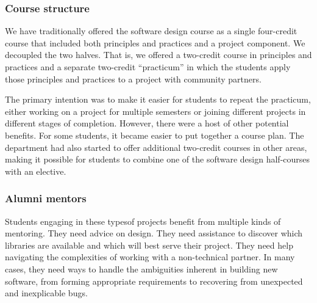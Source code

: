 \subsubsection{Course structure}

We have traditionally offered the software design course as a single
four-credit course that included both principles and practices
and a project component.  We decoupled the two halves.  That is,
we offered a two-credit course in principles and practices and a
separate two-credit ``practicum'' in which the students apply those
principles and practices to a project with community partners.

The primary intention was to make it easier for students to repeat
the practicum, either working on a project for multiple semesters
or joining different projects in different stages of completion.
However, there were a host of other potential benefits.  For some
students, it became easier to put together a course plan. 
The department had also started to offer additional two-credit
courses in other areas, making it possible for students to combine
one of the software design half-courses with an elective.

\subsubsection{Alumni mentors}

Students engaging in these typesof projects benefit from multiple
kinds of mentoring.  They need advice on design.  They need
assistance to discover which libraries are available and which will
best serve their project.  They need help navigating the complexities
of working with a non-technical partner.  In many cases, they need
ways to handle the ambiguities inherent in building new software,
from forming appropriate requirements to recovering from unexpected
and inexplicable bugs.

